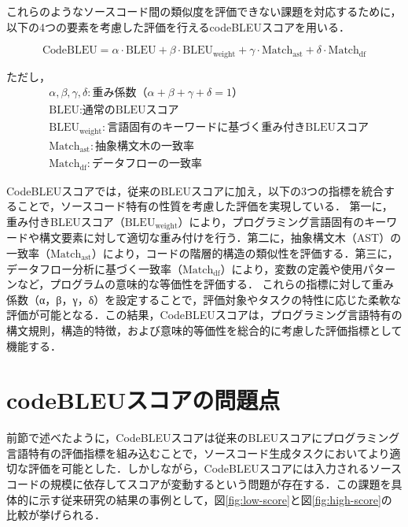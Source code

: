 \documentclass[11pt]{jreport}
\begin{document}
これらのようなソースコード間の類似度を評価できない課題を対応するために，以下の4つの要素を考慮した評価を行えるcodeBLEUスコアを用いる．

\begin{displaymath}
\text{CodeBLEU} = \alpha \cdot \text{BLEU} + \beta \cdot \text{BLEU}_{\text{weight}} + \gamma \cdot \text{Match}_{\text{ast}} + \delta \cdot \text{Match}_{\text{df}}
\end{displaymath}

\noindent
ただし，
\begin{align*}
&\alpha, \beta, \gamma, \delta: \text{重み係数（}\alpha + \beta + \gamma + \delta = 1\text{）} \\
&\text{BLEU}: \text{通常のBLEUスコア} \\
&\text{BLEU}_{\text{weight}}: \text{言語固有のキーワードに基づく重み付きBLEUスコア} \\
&\text{Match}_{\text{ast}}: \text{抽象構文木の一致率} \\
&\text{Match}_{\text{df}}: \text{データフローの一致率}
\end{align*}

CodeBLEUスコアでは，従来のBLEUスコアに加え，以下の3つの指標を統合することで，ソースコード特有の性質を考慮した評価を実現している．
第一に，重み付きBLEUスコア（$\text{BLEU}_{\text{weight}}$）により，プログラミング言語固有のキーワードや構文要素に対して適切な重み付けを行う．第二に，抽象構文木（AST）の一致率（$\text{Match}_{\text{ast}}$）により，コードの階層的構造の類似性を評価する．第三に，データフロー分析に基づく一致率（$\text{Match}_{\text{df}}$）により，変数の定義や使用パターンなど，プログラムの意味的な等価性を評価する．
これらの指標に対して重み係数（α，β，γ，δ）を設定することで，評価対象やタスクの特性に応じた柔軟な評価が可能となる．この結果，CodeBLEUスコアは，プログラミング言語特有の構文規則，構造的特徴，および意味的等価性を総合的に考慮した評価指標として機能する．


\section {codeBLEUスコアの問題点}
前節で述べたように，CodeBLEUスコアは従来のBLEUスコアにプログラミング言語特有の評価指標を組み込むことで，ソースコード生成タスクにおいてより適切な評価を可能とした．しかしながら，CodeBLEUスコアには入力されるソースコードの規模に依存してスコアが変動するという問題が存在する．この課題を具体的に示す従来研究の結果の事例として，図\ref{fig:low-score}と図\ref{fig:high-score}の比較が挙げられる．
\end{document}
